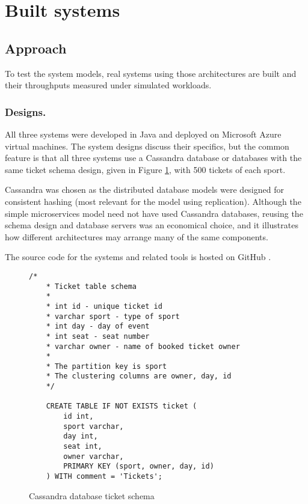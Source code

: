 %
%

\section{Built systems}\label{sec:built-systems}

\subsection{Approach}

To test the system models, real systems using those architectures are built and their throughputs measured under simulated workloads.

\subsubsection{Designs.}  All three systems were developed in Java and deployed on Microsoft Azure virtual machines.  The system designs discuss their specifics, but the common feature is that all three systems use a Cassandra database or databases with the same ticket schema design, given in Figure \ref{figure:cassandra_ticket_schema}, with 500 tickets of each sport.

Cassandra was chosen as the distributed database models were designed for consistent hashing (most relevant for the model using replication).  Although the simple microservices model need not have used Cassandra databases, reusing the schema design and database servers was an economical choice, and it illustrates how different architectures may arrange many of the same components.

The source code for the systems and related tools is hosted on GitHub \cite{RN1073}.

\begin{figure}
	\caption{Cassandra database ticket schema}
	\label{figure:cassandra_ticket_schema}
	\centering
	\begin{lstlisting}[basicstyle=\ttfamily]
	/*
	* Ticket table schema
	* 
	* int id - unique ticket id
	* varchar sport - type of sport
	* int day - day of event
	* int seat - seat number
	* varchar owner - name of booked ticket owner
	* 
	* The partition key is sport
	* The clustering columns are owner, day, id
	*/
	
	CREATE TABLE IF NOT EXISTS ticket (
		id int,
		sport varchar,
		day int,
		seat int,
		owner varchar,
		PRIMARY KEY (sport, owner, day, id)
	) WITH comment = 'Tickets';
	\end{lstlisting}
\end{figure}

